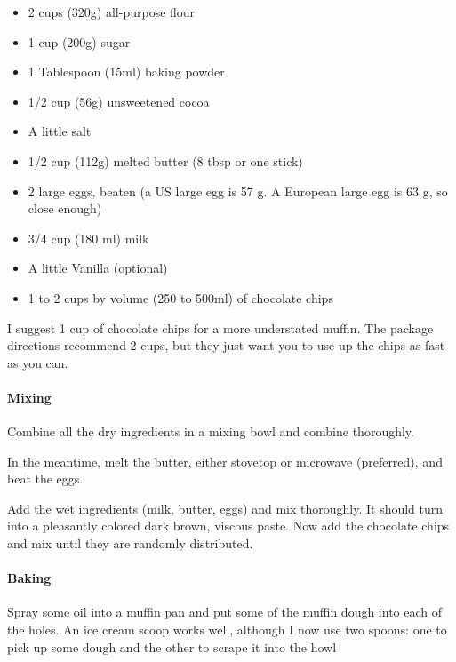 \begin{itemize}


\item 2 cups (320g) all-purpose flour

\item 1 cup (200g) sugar

\item 1 Tablespoon (15ml) baking powder

\item 1/2 cup (56g) unsweetened cocoa

\item A little salt

\item 1/2 cup (112g) melted butter (8 tbsp or one stick)

\item 2 large eggs, beaten (a US large egg is 57 g. A European large egg is 63 g, so close enough)

\item 3/4 cup (180 ml) milk

\item A little Vanilla (optional)

\item 1 to 2 cups by volume (250 to 500ml) of chocolate chips
\end{itemize}


I suggest 1 cup of chocolate chips for a more understated muffin. The package directions recommend 2 cups, but they just want you to use up the chips as fast as you can.

\paragraph{Mixing}


Combine all the dry ingredients in a mixing bowl and combine thoroughly.

In the meantime, melt the butter, either stovetop or microwave (preferred), and beat the eggs.

Add the wet ingredients (milk, butter, eggs) and mix thoroughly. It should turn into a pleasantly colored dark brown, viscous paste. Now add the chocolate chips and mix until they are randomly distributed.

\paragraph{Baking}


Spray some oil into a muffin pan and put some of the muffin dough into each of the holes. An ice cream scoop works well, although I now use two spoons: one to pick up some dough and the other to scrape it into the howl

